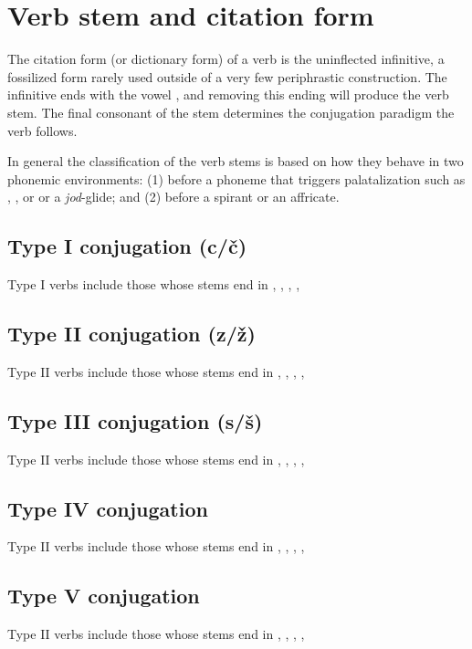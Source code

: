 \section{Verb stem and citation form}

\par The citation form (or dictionary form) of a verb is the uninflected infinitive, a fossilized form rarely used outside of a very few periphrastic construction. The infinitive ends with the vowel , and removing this ending will produce the verb stem. The final consonant  of the stem determines the conjugation paradigm the verb follows.

In general the classification of the verb stems is based on how they behave in two phonemic environments: (1) before a phoneme that triggers palatalization such as , ,  or  or a \emph{jod}-glide; and (2) before a spirant or an affricate.

\subsection{Type I conjugation (c/\v{c})}
Type I verbs include those whose stems end in , , , ,

\subsection{Type II conjugation (z/\v{z})}
Type II verbs include those whose stems end in , , , ,

\subsection{Type III conjugation (s/\v{s})}
Type II verbs include those whose stems end in , , , ,

\subsection{Type IV conjugation}
Type II verbs include those whose stems end in , , , ,

\subsection{Type V conjugation}
Type II verbs include those whose stems end in , , , ,


